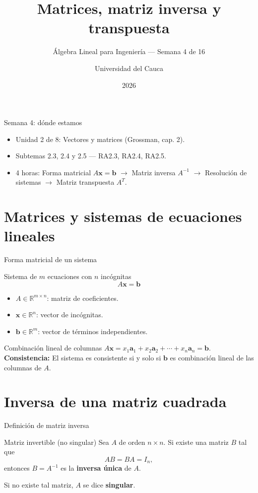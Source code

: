 \documentclass[11pt]{beamer}
\title[Semana 4: Matriz Inversa y Transpuesta]{Matrices, matriz inversa y transpuesta}
\subtitle{Álgebra Lineal para Ingeniería --- Semana 4 de 16}
\author{Universidad del Cauca}
\date{2026}
\newcommand{\R}{\mathbb{R}}
\newcommand{\vv}[1]{\mathbf{#1}}
\begin{document}
\begin{frame}
  \titlepage
\end{frame}

\begin{frame}{Semana 4: dónde estamos}
  \begin{itemize}
    \item Unidad 2 de 8: Vectores y matrices (Grossman, cap. 2).
    \item Subtemas 2.3, 2.4 y 2.5 --- RA2.3, RA2.4, RA2.5.
    \item 4 horas: Forma matricial $A\vv{x}=\vv{b}$ $\to$ Matriz inversa $A^{-1}$ $\to$ Resolución de sistemas $\to$ Matriz transpuesta $A^T$.
  \end{itemize}
  \tableofcontents
\end{frame}

\section{Matrices y sistemas de ecuaciones lineales}

\begin{frame}{Forma matricial de un sistema}
  \begin{block}{Sistema de $m$ ecuaciones con $n$ incógnitas}
    \[
      A\vv{x} = \vv{b}
    \]
    \begin{itemize}
      \item $A \in \R^{m\times n}$: matriz de coeficientes.
      \item $\vv{x} \in \R^n$: vector de incógnitas.
      \item $\vv{b} \in \R^m$: vector de términos independientes.
    \end{itemize}
  \end{block}
  \vfill
  \begin{block}{Combinación lineal de columnas}
    $A\vv{x} = x_1 \vv{a}_1 + x_2 \vv{a}_2 + \cdots + x_n \vv{a}_n = \vv{b}$.\\
    \textbf{Consistencia:} El sistema es consistente si y solo si $\vv{b}$ es combinación lineal de las columnas de $A$.
  \end{block}
\end{frame}

\section{Inversa de una matriz cuadrada}

\begin{frame}{Definición de matriz inversa}
  \begin{block}{Matriz invertible (no singular)}
    Sea $A$ de orden $n\times n$. Si existe una matriz $B$ tal que
    \[
      A B = B A = I_n,
    \]
    entonces $B = A^{-1}$ es la \textbf{inversa única} de $A$.
  \end{block}
  \vfill
  Si no existe tal matriz, $A$ se dice \textbf{singular}.
\end{frame}
\end{document}
